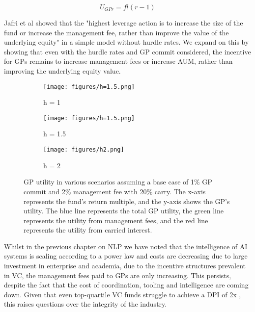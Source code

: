 \documentclass[a4paper, oneside]{discothesis}
\begin{document}
\begin{equation}
U_{GPr} = fl(r-1)
\end{equation}

Jafri et al showed that the "highest leverage action is to increase the size of the fund or increase the management fee, rather than improve the value of the underlying equity" \cite{jafri_distributed_vc} in a simple model without hurdle rates. We expand on this by showing that even with the hurdle rates and GP commit considered, the incentive for GPs remains to increase management fees or increase AUM, rather than improving the underlying equity value.

\begin{figure}[htbp]
    \centering
    \begin{subfigure}[b]{0.32\textwidth}
      \centering
      \texttt{[image: figures/h=1.5.png]}
      \caption{h = 1}
      \label{fig:h1}
    \end{subfigure}
    \hfill
    \begin{subfigure}[b]{0.32\textwidth}
      \centering
      \texttt{[image: figures/h=1.5.png]}
      \caption{h = 1.5}
      \label{fig:h1.5}
    \end{subfigure}
    \hfill
    \begin{subfigure}[b]{0.32\textwidth}
      \centering
      \texttt{[image: figures/h2.png]}
      \caption{h = 2}
      \label{fig:h2}
    \end{subfigure}
    \caption{GP utility in various scenarios assuming a base case of 1\% GP commit and 2\% management fee with 20\% carry. The x-axis represents the fund's return multiple, and the y-axis shows the GP's utility. The blue line represents the total GP utility, the green line represents the utility from management fees, and the red line represents the utility from carried interest.}
    \label{fig:gp_utility_scenarios}
    \end{figure}

Whilst in the previous chapter on NLP we have noted that the intelligence of AI systems is scaling according to a power law and costs are decreasing due to large investment in enterprise and academia, due to the incentive structures prevalent in VC, the management fees paid to GPs are only increasing. This persists, despite the fact that the cost of coordination, tooling and intelligence are coming down. Given that even top-quartile VC funds struggle to achieve a DPI of 2x \cite{gompers1994riseandfallofvc}, this raises questions over the integrity of the industry. 
\end{document}

